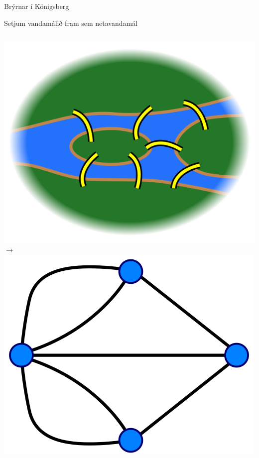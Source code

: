 \documentclass{beamer}
\begin{document}
\begin{frame}{Brýrnar í Königsberg}
\begin{center}
Setjum vandamálið fram sem netavandamál
\end{center}

\begin{columns}
\includegraphics[width=\linewidth]{Pics/konigsberg2}
$\to$
\includegraphics[width=\linewidth]{Pics/konigsberg3}
\end{columns}
\end{frame}
\end{document}
